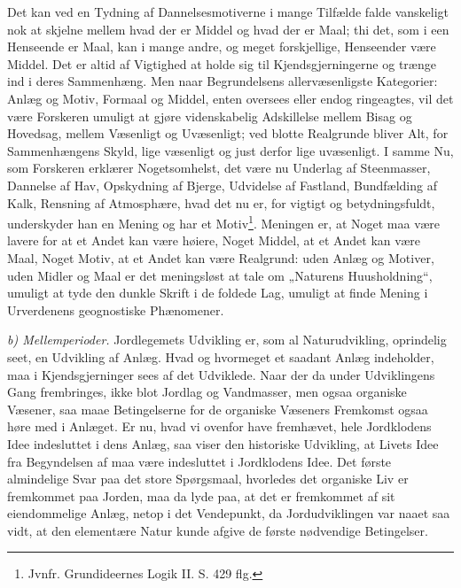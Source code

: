 \documentclass[12pt,a4paper]{book}
\newcommand{\runin}[1]{\emph{#1}\hspace{0.4em}}
\begin{document}
Det kan ved en Tydning af Dannelsesmotiverne i mange Tilfælde falde vanskeligt
nok at skjelne mellem hvad der er Middel og hvad der er Maal; thi det, som i
een Henseende er Maal, kan i mange andre, og meget forskjellige, Henseender
være Middel. Det er altid af Vigtighed at holde sig til Kjendsgjerningerne og
trænge ind i deres Sammenhæng. Men naar Begrundelsens allervæsenligste
Kategorier: Anlæg og Motiv, Formaal og Middel, enten oversees eller endog
ringeagtes, vil det være Forskeren umuligt at gjøre videnskabelig Adskillelse
mellem Bisag og Hovedsag, mellem Væsenligt og Uvæsenligt; ved blotte
Realgrunde bliver Alt,
for Sammenhængens Skyld, lige væsenligt og just derfor lige uvæsenligt. I
samme Nu, som Forskeren erklærer Nogetsomhelst, det være nu Underlag af
Steenmasser, Dannelse af Hav, Opskydning af Bjerge, Udvidelse af Fastland,
Bundfælding af Kalk, Rensning af Atmosphære, hvad det nu er, for vigtigt og
betydningsfuldt, underskyder han en Mening og har et
Motiv\footnote{%
Jvnfr. Grundideernes Logik II. S. 429 flg.}. Meningen er, at Noget maa være
lavere for at et Andet kan være høiere, Noget Middel, at et Andet kan være
Maal, Noget Motiv, at et Andet kan være Realgrund: uden Anlæg og Motiver,
uden Midler og Maal er det meningsløst at tale om „Naturens Huusholdning“,
umuligt at tyde den dunkle Skrift i de foldede Lag, umuligt at finde Mening i
Urverdenens geognostiske Phænomener.

\runin{b) Mellemperioder.} Jordlegemets Udvikling er, som al Naturudvikling,
oprindelig seet, en Udvikling af Anlæg. Hvad og hvormeget et saadant Anlæg
indeholder, maa i Kjendsgjerninger sees af det Udviklede. Naar der da under
Udviklingens Gang frembringes, ikke blot Jordlag og Vandmasser, men ogsaa
organiske Væsener, saa maae Betingelserne for de organiske Væseners Fremkomst
ogsaa høre med i Anlæget. Er nu, hvad vi ovenfor have fremhævet, hele
Jordklodens Idee indesluttet i dens Anlæg, saa viser den historiske Udvikling,
at Livets Idee fra Begyndelsen af maa være indesluttet i Jordklodens Idee. Det
første almindelige Svar paa det store Spørgsmaal, hvorledes det organiske Liv
er fremkommet paa Jorden, maa da lyde paa, at det er fremkommet af sit
eiendommelige Anlæg, netop i det Vendepunkt, da Jordudviklingen var naaet saa
vidt, at den elementære Natur kunde afgive de første nødvendige Betingelser.
\end{document}
